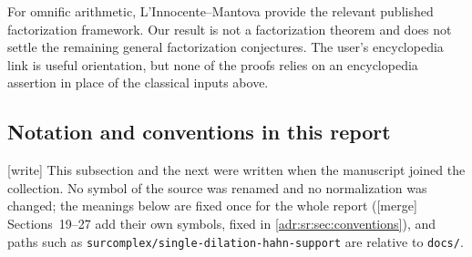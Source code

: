 \documentclass[11pt,letterpaper]{article}
\numberwithin{equation}{section}
\theoremstyle{definition}
\theoremstyle{remark}
\newcommand{\rpath}[1]{\nolinkurl{#1}}%
\newcommand{\wtag}{\textup{[write]}}%
\newcommand{\mtag}{\textup{[merge]}}%
\begin{document}
For omnific arithmetic, L'Innocente--Mantova \cite{LM} provide the relevant
published factorization framework. Our result is not a factorization theorem
and does not settle the remaining general factorization conjectures.
The user's encyclopedia link \cite{Wiki} is useful orientation, but none
of the proofs relies on an encyclopedia assertion in place of the
classical inputs above.

\subsection{Notation and conventions in this report}
\label{adr:sec:conventions}

\wtag{} This subsection and the next were written when the manuscript
joined the collection. No symbol of the source was renamed and no
normalization was changed; the meanings below are fixed once for the whole
report (\mtag{} Sections~19--27 add their own symbols, fixed in
\cref{adr:sr:sec:conventions}), and paths such as \rpath{surcomplex/single-dilation-hahn-support}
are relative to \rpath{docs/}.
\end{document}

